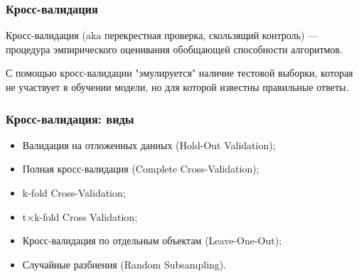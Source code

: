 \documentclass[11pt]{beamer}
\begin{document}
	\begin{frame}
		\frametitle{Кросс-валидация}
		Кросс-валидация (aka перекрестная проверка, скользящий контроль) --- процедура эмпирического оценивания обобщающей способности алгоритмов. 
		
		С помощью кросс-валидации "эмулируется" наличие тестовой выборки, которая не участвует в обучении модели, но для которой известны правильные ответы.
		
	\end{frame}
	\begin{frame}
		\frametitle{Кросс-валидация: виды}
		\begin{itemize}
			\item Валидация на отложенных данных (Hold-Out Validation);
			\item Полная кросс-валидация (Complete Cross-Validation);
			\item k-fold Cross-Validation;
			\item t$\times$k-fold Cross Validation;
			\item Кросс-валидация по отдельным объектам (Leave-One-Out);
			\item Случайные разбиения (Random Subsampling).
		\end{itemize}
		
	\end{frame}
\end{document}
